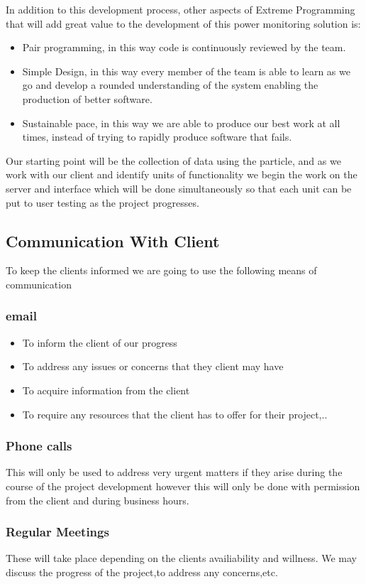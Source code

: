 \documentclass{scrartcl}
\begin{document}
In addition to this development process, other aspects of Extreme Programming that will add great value to the development of this power monitoring solution is:
\begin{itemize}
\item Pair programming, in this way code is continuously reviewed by the team.
\item Simple Design, in this way every member of the team is able to learn as we go and develop a rounded understanding of the system enabling the production of better software.
\item Sustainable pace, in this way we are able to produce our best work at all times, instead of trying to rapidly produce software that fails.
\end{itemize}
Our starting point will be the collection of data using the particle, and as we work with our client and identify units of functionality we begin the work on the server and interface which will be done simultaneously so that each unit can be put to user testing as the project progresses.
\subsection{Communication With Client}
To keep the clients informed we are going to use the following means of communication
\subsubsection{email}
\begin{itemize}
\item To inform the client of our progress
\item To address any issues or concerns that they client may have
\item To acquire information from the client
\item To require any resources that the client has to offer for their project,..
\end{itemize}

\subsubsection{Phone calls}
 This will only be used to address very urgent matters if they arise during the course of the project development 
 however this will only be done with permission from the client and during business hours.
 
\subsubsection{Regular Meetings}	 
These will take place depending on the clients availiability and willness.
We may discuss the progress of the project,to address any concerns,etc.
\end{document}
